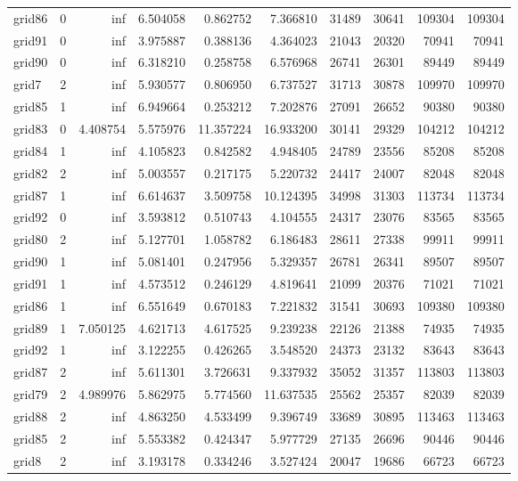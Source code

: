 \begin{longtable}{|l|r|r|r|r|r|r|r|r|r|}
grid86 & 0 & inf & 6.504058 & 0.862752 & 7.366810 & 31489 & 30641 & 109304 & 109304 \\
grid91 & 0 & inf & 3.975887 & 0.388136 & 4.364023 & 21043 & 20320 & 70941 & 70941 \\
grid90 & 0 & inf & 6.318210 & 0.258758 & 6.576968 & 26741 & 26301 & 89449 & 89449 \\
grid7 & 2 & inf & 5.930577 & 0.806950 & 6.737527 & 31713 & 30878 & 109970 & 109970 \\
grid85 & 1 & inf & 6.949664 & 0.253212 & 7.202876 & 27091 & 26652 & 90380 & 90380 \\
grid83 & 0 & 4.408754 & 5.575976 & 11.357224 & 16.933200 & 30141 & 29329 & 104212 & 104212 \\
grid84 & 1 & inf & 4.105823 & 0.842582 & 4.948405 & 24789 & 23556 & 85208 & 85208 \\
grid82 & 2 & inf & 5.003557 & 0.217175 & 5.220732 & 24417 & 24007 & 82048 & 82048 \\
grid87 & 1 & inf & 6.614637 & 3.509758 & 10.124395 & 34998 & 31303 & 113734 & 113734 \\
grid92 & 0 & inf & 3.593812 & 0.510743 & 4.104555 & 24317 & 23076 & 83565 & 83565 \\
grid80 & 2 & inf & 5.127701 & 1.058782 & 6.186483 & 28611 & 27338 & 99911 & 99911 \\
grid90 & 1 & inf & 5.081401 & 0.247956 & 5.329357 & 26781 & 26341 & 89507 & 89507 \\
grid91 & 1 & inf & 4.573512 & 0.246129 & 4.819641 & 21099 & 20376 & 71021 & 71021 \\
grid86 & 1 & inf & 6.551649 & 0.670183 & 7.221832 & 31541 & 30693 & 109380 & 109380 \\
grid89 & 1 & 7.050125 & 4.621713 & 4.617525 & 9.239238 & 22126 & 21388 & 74935 & 74935 \\
grid92 & 1 & inf & 3.122255 & 0.426265 & 3.548520 & 24373 & 23132 & 83643 & 83643 \\
grid87 & 2 & inf & 5.611301 & 3.726631 & 9.337932 & 35052 & 31357 & 113803 & 113803 \\
grid79 & 2 & 4.989976 & 5.862975 & 5.774560 & 11.637535 & 25562 & 25357 & 82039 & 82039 \\
grid88 & 2 & inf & 4.863250 & 4.533499 & 9.396749 & 33689 & 30895 & 113463 & 113463 \\
grid85 & 2 & inf & 5.553382 & 0.424347 & 5.977729 & 27135 & 26696 & 90446 & 90446 \\
grid8 & 2 & inf & 3.193178 & 0.334246 & 3.527424 & 20047 & 19686 & 66723 & 66723 \\

\end{longtable}
